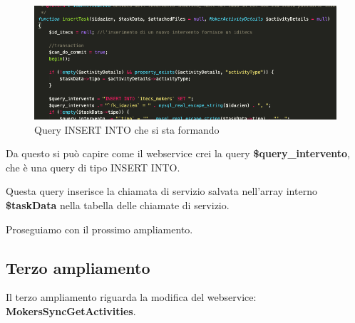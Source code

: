 \begin{figure}[!h] 
	\centering
	\includegraphics[scale = 0.5]{immagini/webservices/ampliamenti/2ampl_funzione_insert.png}
	\caption{Query INSERT INTO che si sta formando}
\end{figure}

\begin{flushleft}
	Da questo si può capire come il webservice crei la query \textbf{\$query\_intervento}, che è una query di tipo INSERT INTO.
	
	Questa query inserisce la chiamata di servizio salvata nell'array interno \textbf{\$taskData} nella tabella delle chiamate di servizio.
	
	\newspace
	
	Proseguiamo con il prossimo ampliamento.
\end{flushleft}

\newpage

\subsection{Terzo ampliamento}
Il terzo ampliamento riguarda la modifica del webservice:  \textbf{MokersSyncGetActivities}.

